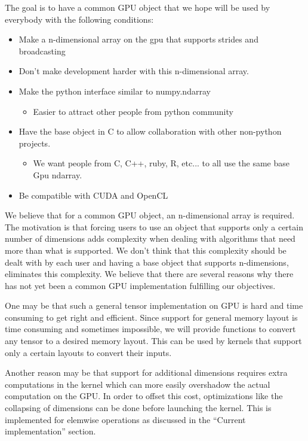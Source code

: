 \documentclass{article} %
\begin{document}
The goal is to have a common GPU object that we hope will be used by everybody with the following conditions:

\begin{itemize}
\item Make a n-dimensional array on the gpu that supports strides and broadcasting
\item Don't make development harder with this n-dimensional array. 
\item Make the python interface similar to numpy.ndarray
  \begin{itemize}
  \item Easier to attract other people from python community
  \end{itemize}
\item Have the base object in C to allow collaboration with other non-python projects.
  \begin{itemize}
  \item We want people from C, C++, ruby, R, etc... to all use the same base Gpu ndarray.
  \end{itemize}
\item Be compatible with CUDA and OpenCL
\end{itemize}

We believe that for a common GPU object, an n-dimensional array is required.
The motivation is that forcing users to use an object that supports only a certain number of dimensions adds complexity when dealing with algorithms that need more than what is supported.
We don't think that this complexity should be dealt with by each user and having a base object that supports n-dimensions, eliminates this complexity.
We believe that there are several reasons why there has not yet been a common GPU implementation fulfilling our objectives.

One may be that such a general tensor implementation on GPU is hard and time consuming to get right and efficient.
Since support for general memory layout is time consuming and sometimes impossible, we will provide functions to convert any tensor to a desired memory layout.  This can be used by kernels that support only a certain layouts to convert their inputs.

Another reason may be that support for additional dimensions requires extra computations in the kernel which can more easily overshadow the actual computation on the GPU.
In order to offset this cost, optimizations like the collapsing of dimensions can be done before launching the kernel.  
This is implemented for elemwise operations as discussed in the ``Current implementation'' section.
\end{document}
